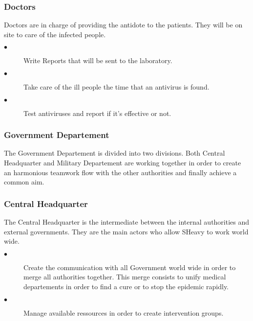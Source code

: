 \subsubsection{Doctors}
Doctors are in charge of providing the antidote to the patients. They will be on
site to care of the infected people. \\
\begin{description}
 \item[$\bullet$] Write Reports that will be sent to the laboratory.
 \item[$\bullet$] Take care of the ill people the time that an antivirus is
 found.
 \item[$\bullet$] Test antiviruses and report if it's effective or not.
\end{description} 

\subsubsection{Government Departement}
The Government Departement is divided into two divisions. Both Central
Headquarter and Military Departement are working together in order to create an harmonious teamwork 
flow with the other authorities and finally achieve a common aim.\\

\subsubsection{Central Headquarter}
The Central Headquarter is the intermediate between the internal authorities and
external governments. They are the main actors who allow SHeavy to work world
wide.\\
\begin{description} 
 \item[$\bullet$] Create the communication with all Government world wide in
 order to merge all authorities together. This merge consists to unify medical
 departements in order to find a cure or to stop the epidemic rapidly.\\
 \item[$\bullet$] Manage available ressources in order to create intervention
 groups.\\ 
\end{description} 


